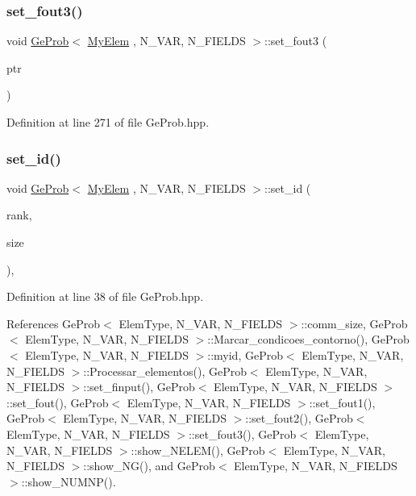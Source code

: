 \subsubsection{\texorpdfstring{set\+\_\+fout3()}{set\_fout3()}}
{\footnotesize\ttfamily void \hyperlink{classGeProb}{Ge\+Prob}$<$ \hyperlink{DG__Prob_8h_a83cd887ced9a6587428f267e50cd4787}{My\+Elem} , N\+\_\+\+V\+AR, N\+\_\+\+F\+I\+E\+L\+DS $>$\+::set\+\_\+fout3 (\begin{DoxyParamCaption}\item[{F\+I\+LE $\ast$}]{ptr }\end{DoxyParamCaption})\hspace{0.3cm}{\ttfamily [inherited]}}



Definition at line 271 of file Ge\+Prob.\+hpp.

\mbox{\label{classGeProb_ae922c4a2ec2974c44cbcfa02e56855db}} 
\subsubsection{\texorpdfstring{set\+\_\+id()}{set\_id()}}
{\footnotesize\ttfamily void \hyperlink{classGeProb}{Ge\+Prob}$<$ \hyperlink{DG__Prob_8h_a83cd887ced9a6587428f267e50cd4787}{My\+Elem} , N\+\_\+\+V\+AR, N\+\_\+\+F\+I\+E\+L\+DS $>$\+::set\+\_\+id (\begin{DoxyParamCaption}\item[{const int}]{rank,  }\item[{const int}]{size }\end{DoxyParamCaption})\hspace{0.3cm}{\ttfamily [inline]}, {\ttfamily [inherited]}}



Definition at line 38 of file Ge\+Prob.\+hpp.



References Ge\+Prob$<$ Elem\+Type, N\+\_\+\+V\+A\+R, N\+\_\+\+F\+I\+E\+L\+D\+S $>$\+::comm\+\_\+size, Ge\+Prob$<$ Elem\+Type, N\+\_\+\+V\+A\+R, N\+\_\+\+F\+I\+E\+L\+D\+S $>$\+::\+Marcar\+\_\+condicoes\+\_\+contorno(), Ge\+Prob$<$ Elem\+Type, N\+\_\+\+V\+A\+R, N\+\_\+\+F\+I\+E\+L\+D\+S $>$\+::myid, Ge\+Prob$<$ Elem\+Type, N\+\_\+\+V\+A\+R, N\+\_\+\+F\+I\+E\+L\+D\+S $>$\+::\+Processar\+\_\+elementos(), Ge\+Prob$<$ Elem\+Type, N\+\_\+\+V\+A\+R, N\+\_\+\+F\+I\+E\+L\+D\+S $>$\+::set\+\_\+finput(), Ge\+Prob$<$ Elem\+Type, N\+\_\+\+V\+A\+R, N\+\_\+\+F\+I\+E\+L\+D\+S $>$\+::set\+\_\+fout(), Ge\+Prob$<$ Elem\+Type, N\+\_\+\+V\+A\+R, N\+\_\+\+F\+I\+E\+L\+D\+S $>$\+::set\+\_\+fout1(), Ge\+Prob$<$ Elem\+Type, N\+\_\+\+V\+A\+R, N\+\_\+\+F\+I\+E\+L\+D\+S $>$\+::set\+\_\+fout2(), Ge\+Prob$<$ Elem\+Type, N\+\_\+\+V\+A\+R, N\+\_\+\+F\+I\+E\+L\+D\+S $>$\+::set\+\_\+fout3(), Ge\+Prob$<$ Elem\+Type, N\+\_\+\+V\+A\+R, N\+\_\+\+F\+I\+E\+L\+D\+S $>$\+::show\+\_\+\+N\+E\+L\+E\+M(), Ge\+Prob$<$ Elem\+Type, N\+\_\+\+V\+A\+R, N\+\_\+\+F\+I\+E\+L\+D\+S $>$\+::show\+\_\+\+N\+G(), and Ge\+Prob$<$ Elem\+Type, N\+\_\+\+V\+A\+R, N\+\_\+\+F\+I\+E\+L\+D\+S $>$\+::show\+\_\+\+N\+U\+M\+N\+P().

